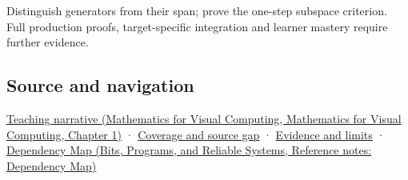 Distinguish generators from their span; prove the one-step subspace criterion. Full production proofs, target-specific integration and learner mastery require further evidence.

\subsection{Source and navigation}\label{appendix-173b52c063ae-source-and-navigation}

\href{../02-Mathematics-for-Visual-Computing/main.pdf\#nameddest=01-foundations-i-ch017-the-reachable-movements-form-a-vector-space}{Teaching narrative (Mathematics for Visual Computing, Mathematics for Visual Computing, Chapter 1)} · \hyperref[appendix-fd090d982a15-phase-6---parts-501-600]{Coverage and source gap} · \hyperref[appendix-a103e7846d21-phase-6---source-analysis-and-verification]{Evidence and limits} · \href{../01-Bits-Programs-and-Reliable-Systems/main.pdf\#nameddest=appendix-4ad47bdd269a}{Dependency Map (Bits, Programs, and Reliable Systems, Reference notes: Dependency Map)}
